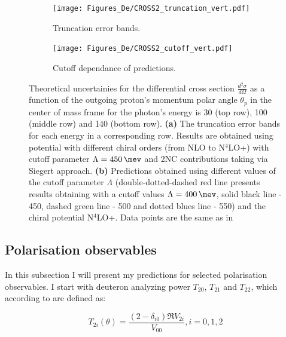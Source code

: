         
    \begin{figure}[h]
        \centering
        \begin{subfigure}[t]{0.46\textwidth}
            \texttt{[image: Figures\_De/CROSS2\_truncation\_vert.pdf]}
            \caption{ Truncation error bands.}
            \label{Diff_cross_truncation}
        \end{subfigure}
        \begin{subfigure}[t]{0.46\textwidth}
            \texttt{[image: Figures\_De/CROSS2\_cutoff\_vert.pdf]}
            \caption{Cutoff dependance  of predictions.}
            \label{Diff_cross_cutoff}
        \end{subfigure}
        \caption{Theoretical uncertainies 
        for the differential cross section $\frac{d^2\sigma}{d\Omega}$
        as a function of the outgoing proton's momentum polar angle $\theta_p$ in the center of mass frame 
        for the photon's energy is \SI{30}{\mev} (top row), \SI{100}{\mev} (middle row) and \SI{140}{\mev} (bottom row).
        {\bf(a)} The truncation error bands for each energy in a corresponding row. 
        Results are obtained using potential with different chiral orders (from NLO to N$^4$LO+) 
        with cutoff parameter $\Lambda=\SI{450}{\mev}$ and 2NC contributions taking via Siegert approach.
        {\bf (b)} Predictions obtained using different values of the cutoff parameter $\Lambda$
        (double-dotted-dashed red line presents results obtaining with 
        a cutoff values $\Lambda=\SI{400}{\mev}$, solid black line - \SI{450}{\mev}, dashed green line - \SI{500}{\mev}
        and dotted blues line - \SI{550}{\mev}) and the chiral potential N$^4$LO+. 
        Data points are the same as in }
        \label{Diff_cross_err}
    \end{figure}

    \clearpage

    \subsection{Polarisation observables}
    \label{sec:polarisation_results}

    In this subsection I will present my predictions for 
    selected polarisation observables.
    I start with deuteron analyzing power $T_{20}$, $T_{21}$ and $T_{22}$,
    which according to \cite{ArenhovelPhotodisint1991} are defined as:
    
    \begin{equation}
        T_{2i} (\theta) = \frac{(2 - \delta_{i0}) \Re V_{2i}}{V_{00}}, i=0,1,2
    \end{equation}

